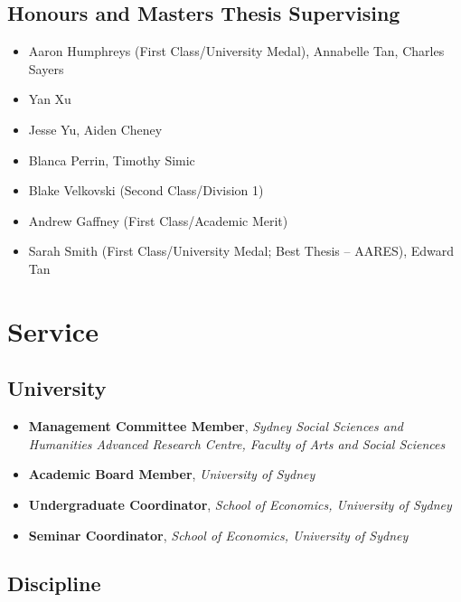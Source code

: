 \documentclass[10pt]{article}
\begin{document}
	\subsection*{Honours and Masters Thesis Supervising}	
	\begin{itemize}
		\item {} Aaron Humphreys (First Class/University Medal), Annabelle Tan, Charles Sayers
		\item {} Yan Xu
		\item {} Jesse Yu, Aiden Cheney
		\item {} Blanca Perrin, Timothy Simic
		\item {} Blake Velkovski (Second Class/Division 1)
		\item {} Andrew Gaffney (First Class/Academic Merit)
		\item {} Sarah Smith (First Class/University Medal; Best Thesis -- AARES), Edward Tan
	\end{itemize}
	
	\bigskip
	
	\section*{Service}
	
	\subsection*{University}
	\begin{itemize}
		\item {} \textbf{Management Committee Member}, \textsl{Sydney Social Sciences and Humanities Advanced Research Centre, Faculty of Arts and Social Sciences}
		\item {} \textbf{Academic Board Member}, \textsl{University of Sydney}
		\item {} \textbf{Undergraduate Coordinator}, \textsl{School of Economics, University of Sydney}
		\item {} \textbf{Seminar Coordinator}, \textsl{School of Economics, University of Sydney}
	\end{itemize}
	
	
	\subsection*{Discipline}
	
\end{document}
